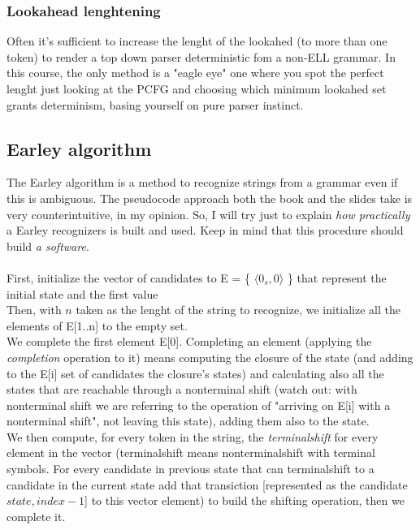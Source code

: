 			\subsubsection{Lookahead lenghtening}
				Often it's sufficient to increase the lenght of the lookahed (to more than one token) to render a top down parser deterministic fom a non-ELL grammar. In this course, the only method is a "eagle eye" one where you spot the perfect lenght just looking at the PCFG and choosing which minimum lookahed set grants determinism, basing yourself on pure parser instinct.
				
		\subsection{Earley algorithm}
			The Earley algorithm is a method to recognize strings from a grammar even if this is ambiguous. The pseudocode approach both the book and the slides take is very counterintuitive, in my opinion. So, I will try just to explain \emph{how practically} a Earley recognizers is built and used. Keep in mind that this procedure should build \emph{a software}.\\\\
			First, initialize the vector of candidates to E = \{ $\langle 0_s, 0 \rangle$ \} that represent the initial state and the first value\\
			Then, with $n$ taken as the lenght of the string to recognize, we initialize all the elements of E[1..n] to the empty set.\\
			We complete the first element E[0]. Completing an element (applying the \emph{completion} operation to it) means computing the closure of the state (and adding to the E[i] set of candidates the closure's states) and calculating also all the states that are reachable through a nonterminal shift (watch out: with nonterminal shift we are referring to the operation of "arriving on E[i] with a nonterminal shift", not leaving this state), adding them also to the state.\\
			We then compute, for every token in the string, the \emph{terminalshift} for every element in the vector (terminalshift means nonterminalshift with terminal symbols. For every candidate in previous state that can terminalshift to a candidate in the current state add that transiction [represented as the candidate $state, index - 1$] to this vector element) to build the shifting operation, then we complete it.\\\\
